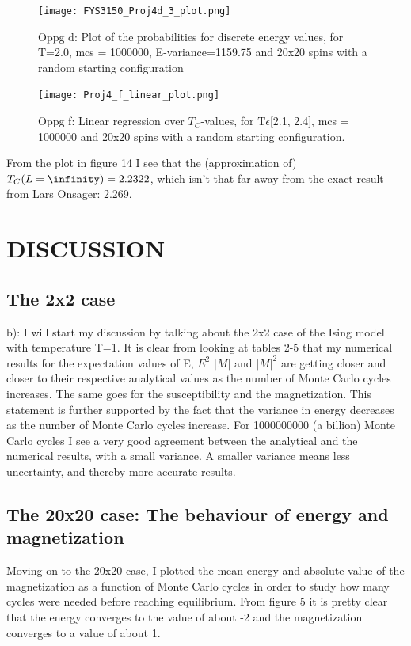 \documentclass[twocolumn]{article}
\begin{document}
\begin{figure}[h!]
  \centering
  \caption{Oppg d: Plot of the probabilities for discrete energy values, for T=2.0, mcs = 1000000, E-variance=1159.75 and 20x20 spins with a random starting configuration}
  \texttt{[image: FYS3150\_Proj4d\_3\_plot.png]}
\end{figure}

\begin{figure}[h!]
  \centering
  \caption{Oppg f: Linear regression over $T_C$-values, for T$\epsilon$[2.1, 2.4], mcs = 1000000 and 20x20 spins with a random starting configuration.}
  \texttt{[image: Proj4\_f\_linear\_plot.png]}
\end{figure}

From the plot in figure 14 I see that the (approximation of) $T_C(L=\infinity) = 2.2322$, which isn't that far away from the exact result from Lars Onsager: 2.269.

\newpage
\newpage
\newpage
\newpage
\newpage
\twocolumngrid
\section{DISCUSSION}
\subsection{The 2x2 case}
b):\newline
I will start my discussion by talking about the 2x2 case of the Ising model with temperature T=1. It is clear from looking at tables 2-5 that my numerical results for the expectation values of E, $E^2$ $|M|$ and $|M|^2$ are getting closer and closer to their respective analytical values as the number of Monte Carlo cycles increases. The same goes for the susceptibility and the magnetization. This statement is further supported by the fact that the variance in energy decreases as the number of Monte Carlo cycles increase. For 1000000000 (a billion) Monte Carlo cycles I see a very good agreement between the analytical and the numerical results, with a small variance. A smaller variance means less uncertainty, and thereby more accurate results.\newline

\subsection{The 20x20 case: The behaviour of energy and magnetization}

Moving on to the 20x20 case, I plotted the mean energy and absolute value of the magnetization as a function of Monte Carlo cycles in order to study how many cycles were needed before reaching equilibrium. From figure 5 it is pretty clear that the energy converges to the value of about -2 and the magnetization converges to a value of about 1.\newline
\end{document}
